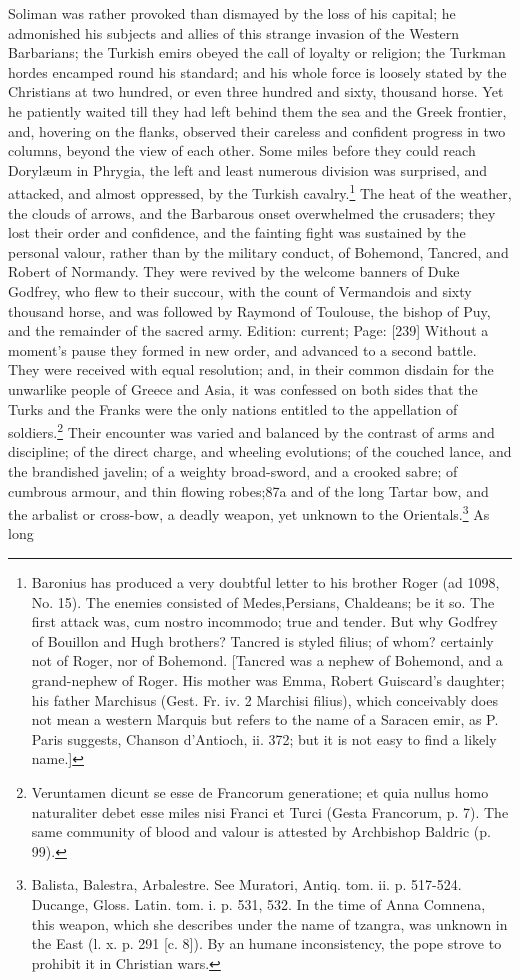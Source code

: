 Soliman was rather provoked than dismayed by the loss of his capital; he admonished his subjects and allies of this strange invasion of the Western Barbarians; the Turkish emirs obeyed the call of loyalty or religion; the Turkman hordes encamped round his standard; and his whole force is loosely stated by the Christians at two hundred, or even three hundred and sixty, thousand horse. Yet he patiently waited till they had left behind them the sea and the Greek frontier, and, hovering on the flanks, observed their careless and confident progress in two columns, beyond the view of each other. Some miles before they could reach Dorylæum in Phrygia, the left and least numerous division was surprised, and attacked, and almost oppressed, by the Turkish cavalry.\footnote{Baronius has produced a very doubtful letter to his brother Roger (ad 1098, No. 15). The enemies consisted of Medes,Persians, Chaldeans; be it so. The first attack was, cum nostro incommodo; true and tender. But why Godfrey of Bouillon and Hugh brothers? Tancred is styled filius; of whom? certainly not of Roger, nor of Bohemond. [Tancred was a nephew of Bohemond, and a grand-nephew of Roger. His mother was Emma, Robert Guiscard\texthebrew{}’s daughter; his father Marchisus (Gest. Fr. iv. 2 Marchisi filius), which conceivably does not mean a western Marquis but refers to the name of a Saracen emir, as P. Paris suggests, Chanson d\texthebrew{}’Antioch, ii. 372; but it is not easy to find a likely name.]} The heat of the weather, the clouds of arrows, and the Barbarous onset overwhelmed the crusaders; they lost their order and confidence, and the fainting fight was sustained by the personal valour, rather than by the military conduct, of Bohemond, Tancred, and Robert of Normandy. They were revived by the welcome banners of Duke Godfrey, who flew to their succour, with the count of Vermandois and sixty thousand horse, and was followed by Raymond of Toulouse, the bishop of Puy, and the remainder of the sacred army. Edition: current; Page: [239] Without a moment\texthebrew{}’s pause they formed in new order, and advanced to a second battle. They were received with equal resolution; and, in their common disdain for the unwarlike people of Greece and Asia, it was confessed on both sides that the Turks and the Franks were the only nations entitled to the appellation of soldiers.\footnote{Veruntamen dicunt se esse de Francorum generatione; et quia nullus homo naturaliter debet esse miles nisi Franci et Turci (Gesta Francorum, p. 7). The same community of blood and valour is attested by Archbishop Baldric (p. 99).} Their encounter was varied and balanced by the contrast of arms and discipline; of the direct charge, and wheeling evolutions; of the couched lance, and the brandished javelin; of a weighty broad-sword, and a crooked sabre; of cumbrous armour, and thin flowing robes;87a and of the long Tartar bow, and the arbalist or cross-bow, a deadly weapon, yet unknown to the Orientals.\footnote{Balista, Balestra, Arbalestre. See Muratori, Antiq. tom. ii. p. 517-524. Ducange, Gloss. Latin. tom. i. p. 531, 532. In the time of Anna Comnena, this weapon, which she describes under the name of tzangra, was unknown in the East (l. x. p. 291 [c. 8]). By an humane inconsistency, the pope strove to prohibit it in Christian wars.} As long 